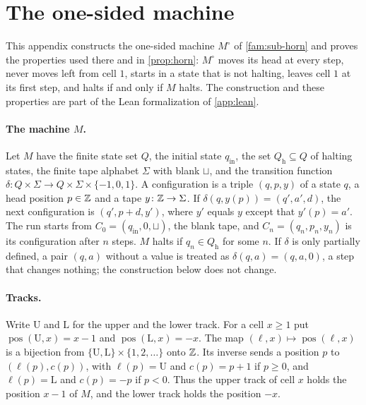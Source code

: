 \section{The one-sided machine}\label{app:machine}

This appendix constructs the one-sided machine $M^\circ$ of \cref{fam:sub-horn} and proves the properties used there and in \cref{prop:horn}: $M^\circ$ moves its head at every step, never moves left from cell $1$, starts in a state that is not halting, leaves cell $1$ at its first step, and halts if and only if $M$ halts. The construction and these properties are part of the Lean formalization of \cref{app:lean}.

\paragraph{The machine $M$.} Let $M$ have the finite state set $Q$, the initial state $q_{\mathrm{in}}$, the set $Q_{\mathrm h}\subseteq Q$ of halting states, the finite tape alphabet $\Sigma$ with blank $\sqcup$, and the transition function $\delta\colon Q\times\Sigma\to Q\times\Sigma\times\{-1,0,1\}$. A configuration is a triple $(q,p,y)$ of a state $q$, a head position $p\in\mathbb{Z}$ and a tape $y\colon\mathbb{Z}\to\Sigma$. If $\delta(q,y(p))=(q',a',d)$, the next configuration is $(q',p+d,y')$, where $y'$ equals $y$ except that $y'(p)=a'$. The run starts from $C_0=(q_{\mathrm{in}},0,\sqcup)$, the blank tape, and $C_n=(q_n,p_n,y_n)$ is its configuration after $n$ steps. $M$ halts if $q_n\in Q_{\mathrm h}$ for some $n$. If $\delta$ is only partially defined, a pair $(q,a)$ without a value is treated as $\delta(q,a)=(q,a,0)$, a step that changes nothing; the construction below does not change.

\paragraph{Tracks.} Write $\mathrm U$ and $\mathrm L$ for the upper and the lower track. For a cell $x\ge1$ put $\operatorname{pos}(\mathrm U,x)=x-1$ and $\operatorname{pos}(\mathrm L,x)=-x$. The map $(\ell,x)\mapsto\operatorname{pos}(\ell,x)$ is a bijection from $\{\mathrm U,\mathrm L\}\times\{1,2,\dots\}$ onto $\mathbb{Z}$. Its inverse sends a position $p$ to $(\ell(p),c(p))$, with $\ell(p)=\mathrm U$ and $c(p)=p+1$ if $p\ge0$, and $\ell(p)=\mathrm L$ and $c(p)=-p$ if $p<0$. Thus the upper track of cell $x$ holds the position $x-1$ of $M$, and the lower track holds the position $-x$.

